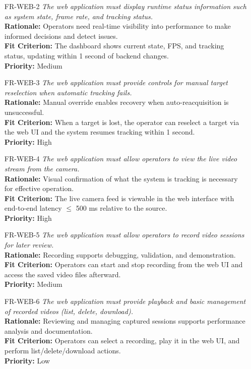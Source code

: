 \documentclass[12pt]{article}
\begin{document}
\begin{itemize}
\item[FR-WEB-2] \emph{The web application must display runtime status information such as system state, frame rate, and tracking status.}\\[2mm]
  {\bf Rationale:} Operators need real-time visibility into performance to make informed decisions and detect issues.\\
  {\bf Fit Criterion:} The dashboard shows current state, FPS, and tracking status, updating within 1 second of backend changes.\\
  {\bf Priority:} Medium

\item[FR-WEB-3] \emph{The web application must provide controls for manual target reselection when automatic tracking fails.}\\[2mm]
  {\bf Rationale:} Manual override enables recovery when auto-reacquisition is unsuccessful.\\
  {\bf Fit Criterion:} When a target is lost, the operator can reselect a target via the web UI and the system resumes tracking within 1 second.\\
  {\bf Priority:} High

\item[FR-WEB-4] \emph{The web application must allow operators to view the live video stream from the camera.}\\[2mm]
  {\bf Rationale:} Visual confirmation of what the system is tracking is necessary for effective operation.\\
  {\bf Fit Criterion:} The live camera feed is viewable in the web interface with end-to-end latency $\leq$ 500 ms relative to the source.\\
  {\bf Priority:} High

\item[FR-WEB-5] \emph{The web application must allow operators to record video sessions for later review.}\\[2mm]
  {\bf Rationale:} Recording supports debugging, validation, and demonstration.\\
  {\bf Fit Criterion:} Operators can start and stop recording from the web UI and access the saved video files afterward.\\
  {\bf Priority:} Medium

\item[FR-WEB-6] \emph{The web application must provide playback and basic management of recorded videos (list, delete, download).}\\[2mm]
  {\bf Rationale:} Reviewing and managing captured sessions supports performance analysis and documentation.\\
  {\bf Fit Criterion:} Operators can select a recording, play it in the web UI, and perform list/delete/download actions.\\
  {\bf Priority:} Low



\end{itemize}
\end{document}
